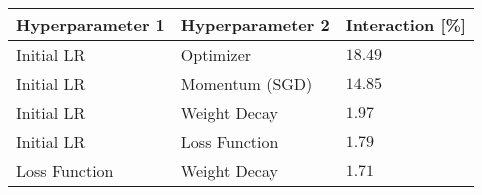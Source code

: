 \begin{tabular}{lll}
\toprule
Hyperparameter 1 & Hyperparameter 2 & Interaction [\%] \\
\midrule
Initial LR & Optimizer & $18.49$ \\
Initial LR & Momentum (SGD) & $14.85$ \\
Initial LR & Weight Decay & $1.97$ \\
Initial LR & Loss Function & $1.79$ \\
Loss Function & Weight Decay & $1.71$ \\
\bottomrule
\end{tabular}
